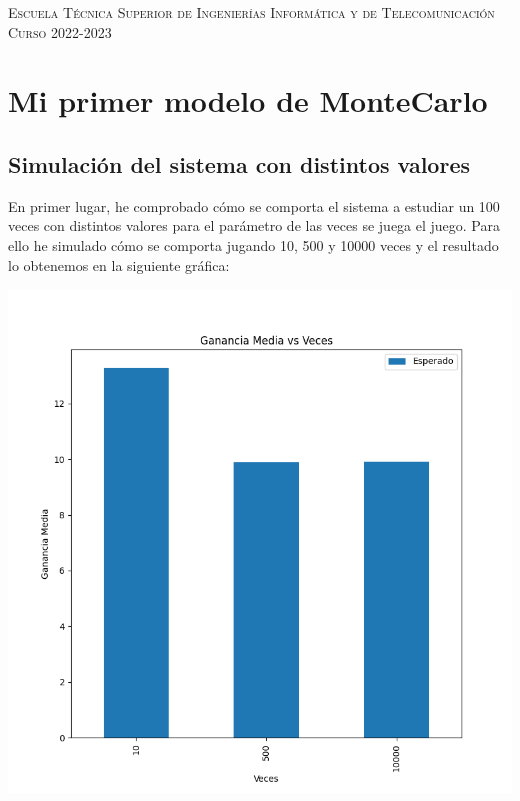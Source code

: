 \documentclass[11pt,a4paper]{report}
\begin{document}
\begin{titlepage}
\begin{minipage}{\textwidth}
\vspace{0.7cm}
\textsc{Escuela Técnica Superior de Ingenierías Informática y de Telecomunicación}\\
\vspace{1cm}
\textsc{Curso 2022-2023}
\end{minipage}
\end{titlepage}

\tableofcontents
\thispagestyle{empty}				%

\newpage

\setlength{\parskip}{1em}

\chapter{Mi primer modelo de MonteCarlo}
\newpage
\section{Simulación del sistema con distintos valores}

En primer lugar, he comprobado cómo se comporta el sistema a estudiar un 100 veces con distintos valores para el parámetro de las veces se juega el juego. Para ello he simulado cómo se comporta jugando 10, 500 y 10000 veces y el resultado lo obtenemos en la siguiente gráfica:
\begin{center}
	\includegraphics[width=0.5\textheight]{img/Cap-1/1-ganancia-media-vs-veces.png}
\end{center}
\end{document}
